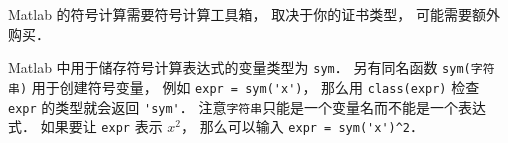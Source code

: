 
Matlab 的符号计算需要符号计算工具箱， 取决于你的证书类型， 可能需要额外购买． 

Matlab 中用于储存符号计算表达式的变量类型为 \verb|sym|．  另有同名函数 \verb|sym(字符串)| 用于创建符号变量， 例如 \verb|expr = sym('x')|， 那么用 \verb|class(expr)| 检查 \verb|expr| 的类型就会返回 \verb|'sym'|． 注意\verb|字符串|只能是一个变量名而不能是一个表达式． 如果要让 \verb|expr| 表示 $x^2$， 那么可以输入 \verb|expr = sym('x')^2|．
